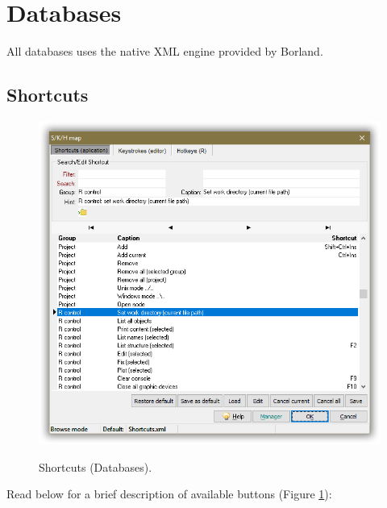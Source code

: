
\hypertarget{working_databases}{}
\section{Databases}

All databases uses the native XML engine provided by Borland.

\subsection{Shortcuts}

\begin{figure}[H]
  \includegraphics[scale=0.35]{./res/shortcuts_dlg.png}\\
  \caption{Shortcuts (Databases).}
  \label{fig:shortcuts_dlg_2}
\end{figure}

Read below for a brief description of available buttons (Figure \ref{fig:shortcuts_dlg_2}):

